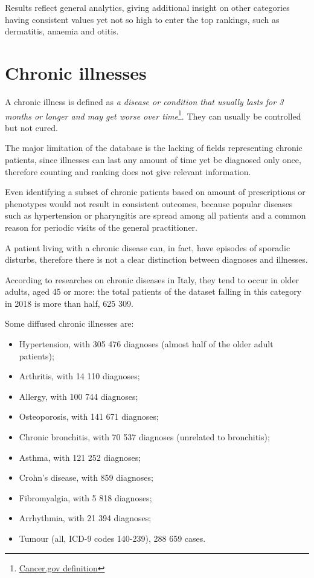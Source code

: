 Results reflect general analytics, giving additional insight on other categories having consistent values yet not so high to enter the top rankings, such as dermatitis, anaemia and otitis. 

\section{Chronic illnesses}
A chronic illness is defined as \textit{a disease or condition that usually lasts for 3 months or longer and may get worse over time}\footnote{\href{https://www.cancer.gov/publications/dictionaries/cancer-terms/def/chronic-disease}{Cancer.gov definition}}. They can usually be controlled but not cured.

The major limitation of the database is the lacking of fields representing chronic patients, since illnesses can last any amount of time yet be diagnosed only once, therefore counting and ranking does not give relevant information.

Even identifying a subset of chronic patients based on amount of prescriptions or phenotypes would not result in consistent outcomes, because popular diseases such as hypertension or pharyngitis are spread among all patients and a common reason for periodic visits of the general practitioner.

A patient living with a chronic disease can, in fact, have episodes of sporadic disturbs, therefore there is not a clear distinction between diagnoses and illnesses.

According to researches on chronic diseases in Italy, they tend to occur in older adults, aged 45 or more: the total patients of the dataset falling in this category in 2018 is more than half, 625 309.

Some diffused chronic illnesses are:
\begin{itemize}
	\item Hypertension, with 305 476 diagnoses (almost half of the older adult patients);
	\item Arthritis, with 14 110 diagnoses;
	\item Allergy, with 100 744 diagnoses;
	\item Osteoporosis, with 141 671 diagnoses;
	\item Chronic bronchitis, with 70 537 diagnoses (unrelated to bronchitis);
	\item Asthma, with 121 252 diagnoses;
	\item Crohn's disease, with 859 diagnoses;
	\item Fibromyalgia, with 5 818 diagnoses;
	\item Arrhythmia, with 21 394 diagnoses;
	\item Tumour (all, ICD-9 codes 140-239), 288 659 cases.
\end{itemize}

